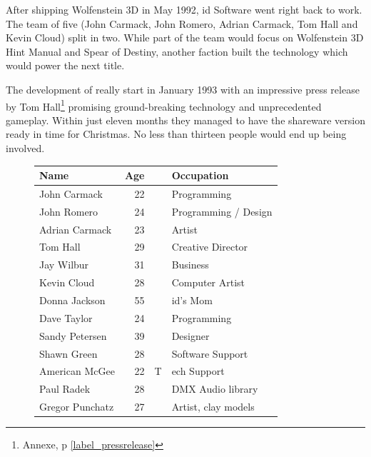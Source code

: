 \vspace{-5pt}
After shipping Wolfenstein 3D in May 1992, id Software went right back to work. The team of five (John Carmack, John Romero, Adrian Carmack, Tom Hall and Kevin Cloud) split in two. While part of the team would focus on Wolfenstein 3D Hint Manual and Spear of Destiny, another faction built the technology which would power the next title.\\
\par
The development of \doom{} really start in January 1993 with an impressive press release by Tom Hall\protect\footnote{Annexe, p \ref{label_pressrelease}} promising ground-breaking technology and unprecedented gameplay. Within just eleven months they managed to have the shareware version ready in time for Christmas. No less than thirteen people would end up being involved.\\
\par
 \begin{figure}[H]
\centering  
\begin{tabularx}{\textwidth}{L{0.3} R{0.2} L{0.1} L{0.4}  }
  \toprule
  \textbf{Name} &  \textbf{Age} & &\textbf{Occupation} \\
  \toprule 
   John Carmack & 22 &  &Programming\\
   John Romero & 24 &  &Programming / Design\\
   Adrian Carmack\protect\footnotemark & 23 &  &Artist\\
   Tom Hall\protect\footnotemark  & 29 &  &Creative Director\\
   Jay Wilbur & 31 &  &Business\\
   Kevin Cloud& 28 &  &Computer Artist\\
   Donna Jackson & 55 & &id's Mom\\   
   Dave Taylor & 24 & &Programming\\
   Sandy Petersen & 39 & &Designer\\
   Shawn Green & 28 & &Software Support\\
   American McGee & 22 & T&ech Support\\
   Paul Radek & 28 & &DMX Audio library\\
   Gregor Punchatz & 27 & &Artist, clay models\\

     \toprule
\end{tabularx}
\label{fig:Id Software team}
\end{figure}



